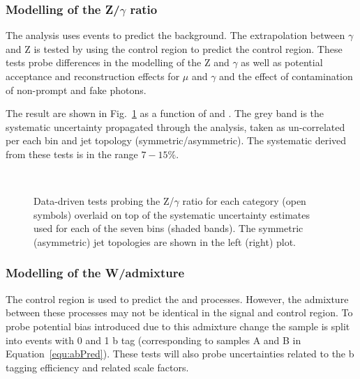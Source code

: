 \subsubsection{Modelling of the Z/$\gamma$ ratio}

The \alphat analysis uses \gj events to predict the \znunu background. The extrapolation 
between $\gamma$ and Z is tested by using the \gj control region to predict the \mmj control region.
These tests probe differences in the modelling of the Z and $\gamma$ as well as potential acceptance and
reconstruction effects for $\mu$ and $\gamma$ and the effect of contamination of non-prompt and fake photons.

The result are shown in Fig.~\ref{fig:closurePhoToMuMu} as a function of \scalht and \njet. 
The grey band is the systematic uncertainty propagated through the analysis, 
taken as un-correlated per each \scalht bin and jet topology (symmetric/asymmetric). The systematic derived from these tests is
in the range $7-15\%$.


\begin{figure}[h!]
  \begin{center}
    ~~
    \caption{Data-driven tests probing the Z/$\gamma$ ratio for each
      \njet category (open symbols) overlaid on top of the systematic
      uncertainty estimates used for each of the seven \scalht bins
      (shaded bands). 
      The symmetric (asymmetric) jet topologies are shown in the left (right) plot.      
    }
    \label{fig:closurePhoToMuMu}
  \end{center} 
\end{figure}

\subsubsection{Modelling of the W/\ttbar admixture}

The \mj control region is used to predict the \wj and \ttbar processes. However, the admixture
between these processes may not be identical in the signal and control region.
To probe potential bias introduced due to this admixture change the sample is split into events with
0 and 1 b tag (corresponding to samples A and B in Equation~\ref{equ:abPred}). These tests will also probe 
uncertainties related to the b tagging efficiency and related scale factors. 

